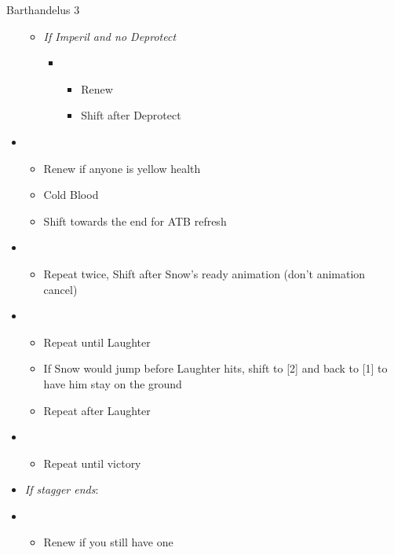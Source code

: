 \begin{battle}[1:26]{Barthandelus 3}
\begin{itemize}
\begin{itemize}
\begin{itemize}
\begin{itemize}
					                  \end{itemize}
				            \end{itemize}
				      \item \textit{If Imperil and no Deprotect}
				            \begin{itemize}
					            \item \fifth
					                  \begin{itemize}
						                  \item Renew
						                  \item Shift after Deprotect
					                  \end{itemize}
				            \end{itemize}
			      \end{itemize}
			\item \sixth
			      \begin{itemize}
				      \item Renew if anyone is yellow health
				      \item Cold Blood
				      \item Shift towards the end for ATB refresh
			      \end{itemize}
			\item \second
			      \begin{itemize}
				      \item Repeat twice, Shift after Snow's ready animation (don't animation cancel)
			      \end{itemize}
			\item \first
			      \begin{itemize}
				      \item Repeat until Laughter
				      \item If Snow would jump before Laughter hits, shift to [2] and back to [1] to have him stay on the ground
				      \item Repeat after Laughter
			      \end{itemize}
			\item \second
			      \begin{itemize}
				      \item Repeat until victory
			      \end{itemize}
			\item \textit{If stagger ends}:
			\item \third
			      \begin{itemize}
				      \item Renew if you still have one

\end{itemize}
\end{itemize}
\end{battle}
